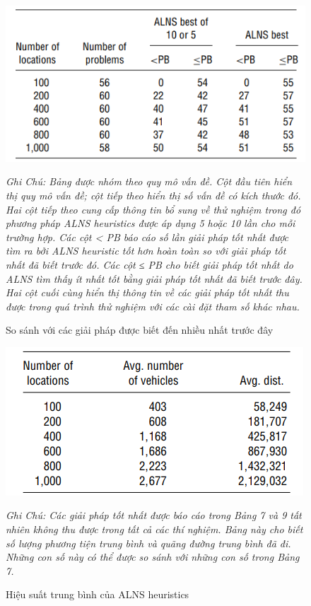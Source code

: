 \begin{center}
    \begin{figure}[htp]
    \caption{So sánh với các giải pháp được biết đến nhiều nhất trước đây}        
    \begin{center}
     \includegraphics[scale=.5]{figures/Thuy_table9}
    \end{center}
  \textit{Ghi Chú: Bảng được nhóm theo quy mô vấn đề. Cột đầu tiên hiển thị quy mô vấn đề; cột tiếp theo hiển thị số vấn đề có kích thước đó. Hai cột tiếp theo cung cấp thông tin bổ sung về thử nghiệm trong đó phương pháp ALNS heuristics được áp dụng 5 hoặc 10 lần cho mỗi trường hợp. Các cột < PB báo cáo số lần giải pháp tốt nhất được tìm ra bởi ALNS heuristic tốt hơn hoàn toàn so với giải pháp tốt nhất đã biết trước đó. Các cột ≤ PB cho biết giải pháp tốt nhất do ALNS tìm thấy ít nhất tốt bằng giải pháp tốt nhất đã biết trước đây. Hai cột cuối cùng hiển thị thông tin về các giải pháp tốt nhất thu được trong quá trình thử nghiệm với các cài đặt tham số khác nhau.}
    \end{figure}
\end{center}


\begin{center}
    \begin{figure}[htp]
    \caption{Hiệu suất trung bình của ALNS heuristics}        
    \begin{center}
     \includegraphics[scale=.7]{figures/Thuy_table10}
    \end{center}
  \textit{Ghi Chú: Các giải pháp tốt nhất được báo cáo trong Bảng 7 và 9 tất nhiên không thu được trong tất cả các thí nghiệm. Bảng này cho biết số lượng phương tiện trung bình và quãng đường trung bình đã đi. Những con số này có thể được so sánh với những con số trong Bảng 7.}
    \end{figure}
\end{center}

